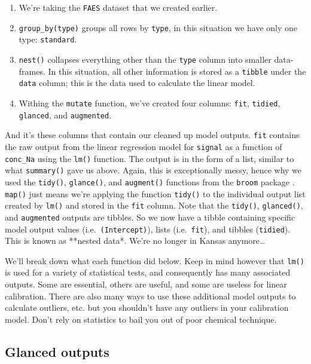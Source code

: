 \documentclass[
]{book}
\providecommand{\tightlist}{%
  \setlength{\itemsep}{0pt}\setlength{\parskip}{0pt}}
\begin{document}
\begin{enumerate}
\def\labelenumi{\arabic{enumi}.}
\tightlist
\item
  We're taking the \texttt{FAES} dataset that we created earlier.
\item
  \texttt{group\_by(type)} groups all rows by \texttt{type}, in this situation we have only one type: \texttt{standard}.
\item
  \texttt{nest()} collapses everything other than the \texttt{type} column into smaller data-frames. In this situation, all other information is stored as a \texttt{tibble} under the \texttt{data} column; this is the data used to calculate the linear model.
\item
  Withing the \texttt{mutate} function, we've created four columns: \texttt{fit}, \texttt{tidied}, \texttt{glanced}, and \texttt{augmented}.
\end{enumerate}

And it's these columns that contain our cleaned up model outputs. \texttt{fit} contains the raw output from the linear regression model for \texttt{signal} as a function of \texttt{conc\_Na} using the \texttt{lm()} function. The output is in the form of a list, similar to what \texttt{summary()} gave us above. Again, this is exceptionally messy, hence why we used the \texttt{tidy()}, \texttt{glance()}, and \texttt{augment()} functions from the \texttt{broom} package . \texttt{map()} just means we're applying the function \texttt{tidy()} to the individual output list created by \texttt{lm()} and stored in the \texttt{fit} column. Note that the \texttt{tidy()}, \texttt{glanced()}, and \texttt{augmented} outputs are tibbles. So we now have a tibble containing specific model output values (i.e.~\texttt{(Intercept)}), lists (i.e.~\texttt{fit}), and tibbles (\texttt{tidied}). This is known as **nested data*. We're no longer in Kansas anymore\ldots{}

We'll break down what each function did below. Keep in mind however that \texttt{lm()} is used for a variety of statistical tests, and consequently has many associated outputs. Some are essential, others are useful, and some are useless for linear calibration. There are also many ways to use these additional model outputs to calculate outliers, etc. but you shouldn't have any outliers in your calibration model. Don't rely on statistics to bail you out of poor chemical technique.

\hypertarget{glanced-outputs}{%
\subsection{Glanced outputs}\label{glanced-outputs}}
\end{document}
